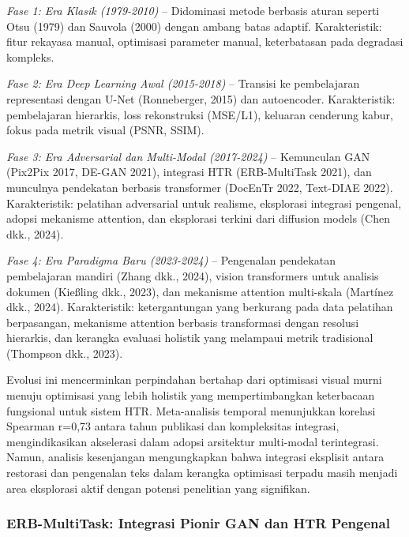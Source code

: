\documentclass[12pt,a4paper]{book}
\begin{document}
\textit{Fase 1: Era Klasik (1979-2010)} -- Didominasi metode berbasis aturan seperti Otsu (1979) dan Sauvola (2000) dengan ambang batas adaptif. Karakteristik: fitur rekayasa manual, optimisasi parameter manual, keterbatasan pada degradasi kompleks.

\textit{Fase 2: Era Deep Learning Awal (2015-2018)} -- Transisi ke pembelajaran representasi dengan U-Net (Ronneberger, 2015) dan autoencoder. Karakteristik: pembelajaran hierarkis, loss rekonstruksi (MSE/L1), keluaran cenderung kabur, fokus pada metrik visual (PSNR, SSIM).

\textit{Fase 3: Era Adversarial dan Multi-Modal (2017-2024)} -- Kemunculan GAN (Pix2Pix 2017, DE-GAN 2021), integrasi HTR (ERB-MultiTask 2021), dan munculnya pendekatan berbasis transformer (DocEnTr 2022, Text-DIAE 2022). Karakteristik: pelatihan adversarial untuk realisme, eksplorasi integrasi pengenal, adopsi mekanisme attention, dan eksplorasi terkini dari diffusion models (Chen dkk., 2024).

\textit{Fase 4: Era Paradigma Baru (2023-2024)} -- Pengenalan pendekatan pembelajaran mandiri (Zhang dkk., 2024), vision transformers untuk analisis dokumen (Kießling dkk., 2023), dan mekanisme attention multi-skala (Martínez dkk., 2024). Karakteristik: ketergantungan yang berkurang pada data pelatihan berpasangan, mekanisme attention berbasis transformasi dengan resolusi hierarkis, dan kerangka evaluasi holistik yang melampaui metrik tradisional (Thompson dkk., 2023).

Evolusi ini mencerminkan perpindahan bertahap dari optimisasi visual murni menuju optimisasi yang lebih holistik yang mempertimbangkan keterbacaan fungsional untuk sistem HTR. Meta-analisis temporal menunjukkan korelasi Spearman r=0,73 antara tahun publikasi dan kompleksitas integrasi, mengindikasikan akselerasi dalam adopsi arsitektur multi-modal terintegrasi. Namun, analisis kesenjangan mengungkapkan bahwa integrasi eksplisit antara restorasi dan pengenalan teks dalam kerangka optimisasi terpadu masih menjadi area eksplorasi aktif dengan potensi penelitian yang signifikan.

\vspace{1.5ex}

\subsubsection{ERB-MultiTask: Integrasi Pionir GAN dan HTR Pengenal}
\label{subsubsec:erb-multitask}

\vspace{1.5ex}
\end{document}
